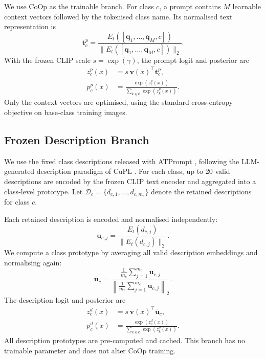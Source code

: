 \documentclass[preprint,12pt]{elsarticle}
\begin{document}
We use CoOp as the trainable branch. For class $c$, a prompt contains $M$ learnable context vectors followed by the tokenised class name. Its normalised text representation is
\begin{equation}
\mathbf{t}^{p}_{c}=\frac{E_t([\mathbf{q}_1,\ldots,\mathbf{q}_M,c])}
{\|E_t([\mathbf{q}_1,\ldots,\mathbf{q}_M,c])\|_2}.
\end{equation}
With the frozen CLIP scale $s=\exp(\gamma)$, the prompt logit and posterior are
\begin{align}
z^{p}_{c}(x) &= s\,\mathbf{v}(x)^{\top}\mathbf{t}^{p}_{c},\\
p^{p}_{c}(x) &= \frac{\exp(z^{p}_{c}(x))}{\sum_{k\in\mathcal{C}}\exp(z^{p}_{k}(x))}.
\end{align}
Only the context vectors are optimised, using the standard cross-entropy objective on base-class training images.

\subsection{Frozen Description Branch}

We use the fixed class descriptions released with ATPrompt \cite{li2025atprompt}, following the LLM-generated description paradigm of CuPL \cite{pratt2023cupl}. For each class, up to 20 valid descriptions are encoded by the frozen CLIP text encoder and aggregated into a class-level prototype. Let $\mathcal{D}_c=\{d_{c,1},\ldots,d_{c,m_c}\}$ denote the retained descriptions for class $c$.

Each retained description is encoded and normalised independently:
\begin{equation}
\mathbf{u}_{c,j}=\frac{E_t(d_{c,j})}{\|E_t(d_{c,j})\|_2}.
\end{equation}
We compute a class prototype by averaging all valid description embeddings and normalising again:
\begin{equation}
\bar{\mathbf{u}}_c=
\frac{\frac{1}{m_c}\sum_{j=1}^{m_c}\mathbf{u}_{c,j}}
{\left\|\frac{1}{m_c}\sum_{j=1}^{m_c}\mathbf{u}_{c,j}\right\|_2}.
\label{eq:desc_proto}
\end{equation}
The description logit and posterior are
\begin{align}
z^{d}_{c}(x) &= s\,\mathbf{v}(x)^{\top}\bar{\mathbf{u}}_c,\\
p^{d}_{c}(x) &= \frac{\exp(z^{d}_{c}(x))}{\sum_{k\in\mathcal{C}}\exp(z^{d}_{k}(x))}.
\end{align}
All description prototypes are pre-computed and cached. This branch has no trainable parameter and does not alter CoOp training.
\end{document}
